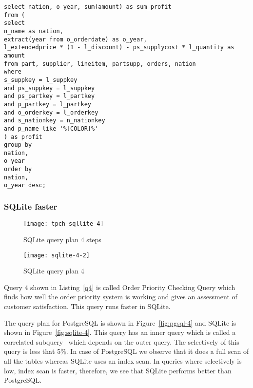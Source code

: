 \begin{minipage}{\linewidth}
\begin{lstlisting}[breaklines=true, numbers=none, label=q9, caption=Query 9]
select nation, o_year, sum(amount) as sum_profit
from (
select
n_name as nation,
extract(year from o_orderdate) as o_year,
l_extendedprice * (1 - l_discount) - ps_supplycost * l_quantity as amount
from part, supplier, lineitem, partsupp, orders, nation
where
s_suppkey = l_suppkey
and ps_suppkey = l_suppkey
and ps_partkey = l_partkey
and p_partkey = l_partkey
and o_orderkey = l_orderkey
and s_nationkey = n_nationkey
and p_name like '%[COLOR]%'
) as profit
group by
nation,
o_year
order by
nation,
o_year desc;
\end{lstlisting}
\end{minipage}

\subsubsection{SQLite faster}


\begin{figure*}[ht]
\centering
     \begin{subfigure}[b]{0.4\textwidth}
         \centering
         \texttt{[image: tpch-sqllite-4]}
         \caption{SQLite query plan 4 steps}
         \label{fig:tpch-sqllite-4}
     \end{subfigure}
     \hfill
     \begin{subfigure}[b]{0.4\textwidth}
         \centering
         \texttt{[image: sqlite-4-2]}
         \caption{SQLite query plan 4}
         \label{fig:sqlite-4-2}
     \end{subfigure}

        \caption{SQLite plan for query 4}
        \label{fig:sqlite-4}
\end{figure*}
Query 4 shown in Listing~\ref{q4} is called Order Priority Checking Query which finds how well the order priority system is working and gives an assessment of customer satisfaction. This query runs faster in SQLite.

The query plan for PostgreSQL is shown in Figure~\ref{fig:pgsql-4} and SQLite is shown in Figure~\ref{fig:sqlite-4}. This query has an inner query which is called a correlated subquery~\cite{ref:sqlite1} which depends on the outer query. The selectively of this query is less that 5\%. In case of PostgreSQL we observe  that it does a full scan of all the tables whereas SQLite uses an index scan. In queries where selectively is low, index scan is faster, therefore, we see that SQLite performs better than PostgreSQL.

